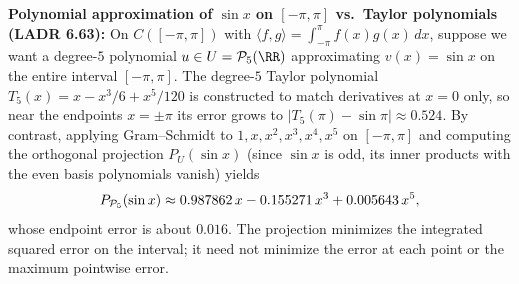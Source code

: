 \documentclass[10pt]{scrartcl}
\newcommand{\ip}[2]{\langle #1,#2\rangle}
\begin{document}
\begin{itemize}
  \ii \textbf{Polynomial approximation of $\sin x$ on $[-\pi,\pi]$ vs.\ Taylor polynomials (LADR 6.63):} On $C([-\pi,\pi])$ with $\ip fg=\int_{-\pi}^\pi f(x)g(x)\,dx$, suppose we want a degree-$5$ polynomial $u\in U=\PP_5(\RR)$ approximating $v(x)=\sin x$ on the entire interval $[-\pi,\pi]$. The degree-$5$ Taylor polynomial $T_5(x)=x-x^3/6+x^5/120$ is constructed to match derivatives at $x=0$ only, so near the endpoints $x=\pm\pi$ its error grows to $|T_5(\pi)-\sin\pi|\approx 0.524$. By contrast, applying Gram--Schmidt to $1,x,x^2,x^3,x^4,x^5$ on $[-\pi,\pi]$ and computing the orthogonal projection $P_U(\sin x)$ (since $\sin x$ is odd, its inner products with the even basis polynomials vanish) yields
  \[
    P_{\mathcal P_5}(\sin x) \approx 0.987862\,x - 0.155271\,x^3 + 0.005643\,x^5,
  \]
  whose endpoint error is about $0.016$. The projection minimizes the integrated squared error on the interval; it need not minimize the error at each point or the maximum pointwise error.
\end{itemize}
\end{document}

